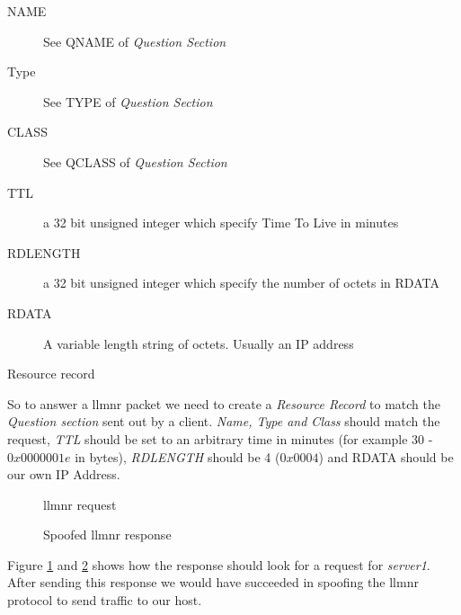 \documentclass{article}
\begin{document}
\begin{customlist}
	\begin{description}
		\item[NAME] See QNAME of \emph{Question Section}
		\item[Type] See TYPE of \emph{Question Section}
		\item[CLASS] See QCLASS of \emph{Question Section}
		\item[TTL] a 32 bit unsigned integer which specify Time To Live in minutes
		\item[RDLENGTH] a 32 bit unsigned integer which specify the number of octets in RDATA
		\item[RDATA] A variable length string of octets. Usually an IP address
	\end{description}
	\caption{Resource record}
	\label{list:llmnr-resource-record}
\end{customlist}

So to answer a \gls{llmnr} packet we need to create a \emph{Resource Record} to match the \emph{Question section} sent out by a client. \emph{Name, Type and Class} should match the request, \emph{TTL} should be set to an arbitrary time in minutes (for example 30 - $0x0000001e$ in bytes), \emph{RDLENGTH} should be 4 ($0x0004$) and RDATA should be our own IP Address.

\begin{figure}[H]
	\scriptsize
	\par
	\centering
	\varwidth{\linewidth}
	
	\endvarwidth
    \par
    
    \caption{\gls{llmnr} request}
    \label{fig:llmnr-request}
\end{figure}

\begin{figure}[H]
	\scriptsize
	\par
	\centering
	\varwidth{\linewidth}
	
	\endvarwidth
    \par
    
    \caption{Spoofed \gls{llmnr} response}
    \label{fig:llmnr-response}
\end{figure}

Figure \ref{fig:llmnr-request} and \ref{fig:llmnr-response} shows how the response should look for a request for \emph{server1}. After sending this response we would have succeeded in spoofing the \gls{llmnr} protocol to send traffic to our host.
\end{document}
